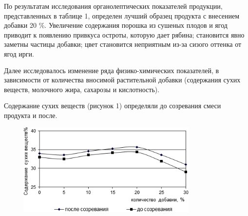 {{%

По результатам исследования органолептических показателей продукции,
представленных в таблице 1, определен лучший образец продукта с
внесением добавки 20 \%. Увеличение содержания порошка из сушеных плодов
и ягод приводит к появлению привкуса остроты, которую дает рябина;
становится явно заметны частицы добавки; цвет становится неприятным
из-за сизого оттенка от ягод ирги.

Далее исследовалось изменение ряда физико-химических показателей, в
зависимости от количества вносимой растительной добавки (содержания
сухих веществ, молочного жира, сахарозы и кислотность).

Содержание сухих веществ (рисунок 1) определяли до созревания смеси
продукта и после.

\begin{figure}[H]
	\centering
	\includegraphics[width=0.8\textwidth]{media/pish2/image10}
	\caption*{}
\end{figure}


}}

